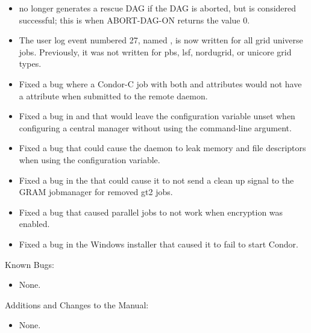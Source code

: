 \begin{itemize}
\item {} no longer generates a rescue DAG if the DAG is
  aborted, but is considered successful;
  this is when ABORT-DAG-ON returns the value 0.

\item The user log event numbered 27,
  named ,
  is now written for all grid universe jobs.
  Previously, it was not written for pbs, lsf, nordugrid, or unicore grid types.

\item Fixed a bug where a Condor-C job with both 
and  attributes would not have a
 attribute when submitted to the remote
 daemon.

\item Fixed a bug in  and  that would
  leave the configuration variable  unset when
  configuring a central manager without using the 
  command-line argument.

\item Fixed a bug that could cause the  daemon
  to leak memory and file descriptors when using the
   configuration variable.

\item Fixed a bug in the  that could cause it to
not send a clean up signal to the GRAM jobmanager for removed gt2 jobs.

\item Fixed a bug that caused parallel jobs to not work when
encryption was enabled.

\item Fixed a bug in the Windows installer that caused it to fail to start
Condor.

\end{itemize}

\noindent Known Bugs:

\begin{itemize}

\item None.

\end{itemize}

\noindent Additions and Changes to the Manual:

\begin{itemize}

\item None.

\end{itemize}



